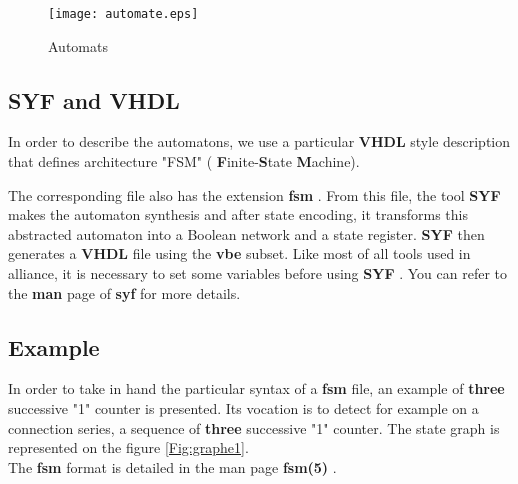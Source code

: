 \documentclass{article}
\begin{document}
{\begin{figure}[H]\centering
  \texttt{[image: automate.eps]}
 \caption{Automats}
  \label{Fig:automaton}
\end{figure}


\subsection{SYF and VHDL}
In order to describe the automatons, we use a particular {\bf VHDL }
style description that defines architecture "FSM" ({ \bf
F}inite-{\bf S}tate { \bf M}achine).

The corresponding file also has the extension { \bf fsm }. From
this file, the tool { \bf SYF } makes the automaton synthesis and
after state encoding, it transforms this abstracted automaton into
a Boolean network and a state register. 
{ \bf SYF } then generates a { \bf VHDL } file using the 
{\bf vbe } subset. 
Like most of all tools used in alliance, it is
necessary to set some variables before using { \bf SYF }. 
You can refer to the { \bf man } page of { \bf syf } for more details.

\subsection{Example}

In order to take in hand the particular syntax of a {
\bf fsm } file, an example of { \bf three } successive "1" counter
is presented. Its vocation is to detect for example on a
connection series, a sequence of { \bf three } successive "1" counter.
The state graph is represented on the figure
\ref{Fig:graphe1}.\\
The { \bf fsm } format is detailed in the man page { \bf fsm(5) }.

}
\end{document}
